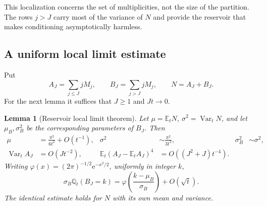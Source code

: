 \documentclass[11pt,letterpaper]{article}
\numberwithin{equation}{section}
\newtheorem{lemma}[theorem]{Lemma}
\theoremstyle{definition}\newtheorem{definition}[theorem]{Definition}
\theoremstyle{remark}\newtheorem{remark}[theorem]{Remark}
\newcommand{\E}{\mathbb E}
\newcommand{\ee}{\mathrm e}
\newcommand{\Q}{\mathbb Q}
\DeclareMathOperator{\Var}{Var}
\begin{document}
This localization concerns the set of multiplicities, not the size of
the partition. The rows $j>J$ carry most of the variance of $N$ and
provide the reservoir that makes conditioning asymptotically harmless.

\subsection{A uniform local limit estimate}
Put
\[
 A_J=\sum_{j\le J}jM_j,\qquad B_J=\sum_{j>J}jM_j,
 \qquad N=A_J+B_J.
\]
For the next lemma it suffices that $J\ge1$ and $Jt\to0$.

\begin{lemma}[Reservoir local limit theorem]\label{dmv:fl:lem:llt}
Let $\mu=\E_tN$, $\sigma^2=\Var_tN$, and let $\mu_B,\sigma_B^2$
be the corresponding parameters of $B_J$. Then
\begin{align}\label{dmv:fl:eq:sizemoments}
 \mu&=\frac{\pi^2}{6t^2}+O(t^{-1}),&
 \sigma^2&\sim\frac{\pi^2}{3t^3},&
 \sigma_B^2&\sim\sigma^2,\\
 \Var_t A_J&=O(Jt^{-2}),&
 \E_t(A_J-\E_tA_J)^4&=O((J^2+J)t^{-4}).
 \nonumber
\end{align}
Writing $\varphi(x)=(2\pi)^{-1/2}\ee^{-x^2/2}$, uniformly in integer $k$,
\begin{equation}\label{dmv:fl:eq:LLT}
 \sigma_B\Q_t(B_J=k)
 =\varphi\!\left(\frac{k-\mu_B}{\sigma_B}\right)+O(\sqrt t).
\end{equation}
The identical estimate holds for $N$ with its own mean and variance.
\end{lemma}
\end{document}
